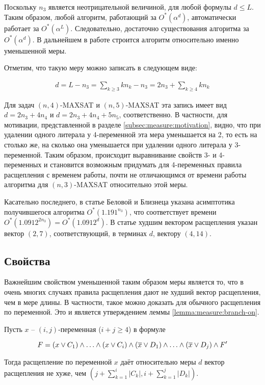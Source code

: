 Поскольку $n_3$ является неотрицательной величиной, для любой формулы $d \leq L$. Таким образом, любой алгоритм, работающий за $O^*(\alpha^d)$, автоматически работает за $O^*(\alpha^L)$. Следовательно, достаточно существования алгоритма за $O^*(\alpha^d)$. В дальнейшем в работе строится алгоритм относительно именно уменьшенной меры.

Отметим, что такую меру можно записать в следующем виде:

\begin{gather}
 d = L - n_3 = \sum_{k \geq 3} kn_k - n_3 = 2n_3 + \sum_{k \geq 4} kn_k
 \label{formula:discounted-length}
\end{gather}

Для задач $(n,4)$-MAXSAT и $(n,5)$-MAXSAT эта запись имеет вид $d = 2n_3 + 4n_4$ и $d = 2n_3 + 4n_4 + 5n_5$, соответственно. В частности, для мотивации, представленной в разделе \ref{subsec:measure:motivation}, видно, что при удалении одного литерала у 4-переменной эта мера уменьшается на 2, то есть на столько же, на сколько она уменьшается при удалении одного литерала у 3-переменной. Таким образом, происходит выравнивание свойств 3- и 4-переменных и становится возможным придумать для 4-переменных правила расщепления с временем работы, почти не отличающимся от времени работы алгоритма для $(n,3)$-MAXSAT относительно этой меры.

Касательно последнего, в статье Беловой и Близнеца \cite{belova18} указана асимптотика получившегося алгоритма $O^*(1.191^{n_3})$, что соответствует времени $O^*(1.0912^{2n_3}) = O^*(1.0912^d)$. В статье худшим вектором расщепления указан вектор $(2,7)$, соответствующий, в терминах $d$, вектору $(4,14)$.

\subsection{Свойства}
\label{subsec:measure:properties}

\firstpar{}Важнейшим свойством уменьшенной таким образом меры является то, что в очень многих случаях правила расщепления дают не худший вектор расщепления, чем в мере длины. В частности, такое можно доказать для обычного расщепления по переменной. Это и является утверждением леммы \ref{lemma:measure:branch-on}.

\begin{lemma}
 Пусть $x$ -- $(i,j)$-переменная ($i + j \geq 4$) в формуле

 $$
  F =
  (x \vee C_1) \wedge
  \ldots \wedge
  (x \vee C_i) \wedge
  (\overline{x} \vee D_1) \wedge
  \ldots \wedge
  (\overline{x} \vee D_j) \wedge
  F'
 $$

 Тогда расщепление по переменной $x$ даёт относительно меры $d$ вектор расщепления не хуже, чем $(j + \sum\limits_{k=1}^i |C_k|, i + \sum\limits_{k=1}^j |D_k|)$.
 \label{lemma:measure:branch-on}
\end{lemma}

